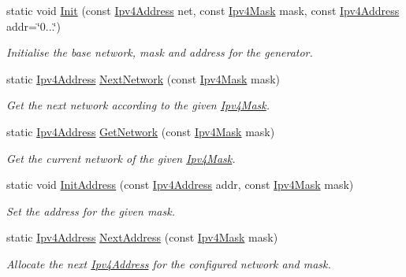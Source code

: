 \begin{DoxyCompactItemize}
\item 
static void \hyperlink{classns3_1_1Ipv4AddressGenerator_ae80dd8273837acb382ae5344e0e5c13d}{Init} (const \hyperlink{classns3_1_1Ipv4Address}{Ipv4\+Address} net, const \hyperlink{classns3_1_1Ipv4Mask}{Ipv4\+Mask} mask, const \hyperlink{classns3_1_1Ipv4Address}{Ipv4\+Address} addr=\char`\"{}0...\char`\"{})
\begin{DoxyCompactList}\small\item\em Initialise the base network, mask and address for the generator. \end{DoxyCompactList}\item 
static \hyperlink{classns3_1_1Ipv4Address}{Ipv4\+Address} \hyperlink{classns3_1_1Ipv4AddressGenerator_a5a7ad78a303bf4b381735c16186ae73b}{Next\+Network} (const \hyperlink{classns3_1_1Ipv4Mask}{Ipv4\+Mask} mask)
\begin{DoxyCompactList}\small\item\em Get the next network according to the given \hyperlink{classns3_1_1Ipv4Mask}{Ipv4\+Mask}. \end{DoxyCompactList}\item 
static \hyperlink{classns3_1_1Ipv4Address}{Ipv4\+Address} \hyperlink{classns3_1_1Ipv4AddressGenerator_ae5c58b6a9070a877a5c79a35b911f55e}{Get\+Network} (const \hyperlink{classns3_1_1Ipv4Mask}{Ipv4\+Mask} mask)
\begin{DoxyCompactList}\small\item\em Get the current network of the given \hyperlink{classns3_1_1Ipv4Mask}{Ipv4\+Mask}. \end{DoxyCompactList}\item 
static void \hyperlink{classns3_1_1Ipv4AddressGenerator_a2f9d70f0a1cee0c57d437785f17ae555}{Init\+Address} (const \hyperlink{classns3_1_1Ipv4Address}{Ipv4\+Address} addr, const \hyperlink{classns3_1_1Ipv4Mask}{Ipv4\+Mask} mask)
\begin{DoxyCompactList}\small\item\em Set the address for the given mask. \end{DoxyCompactList}\item 
static \hyperlink{classns3_1_1Ipv4Address}{Ipv4\+Address} \hyperlink{classns3_1_1Ipv4AddressGenerator_a01aa8d8b1295187c0a1c9074d63abe11}{Next\+Address} (const \hyperlink{classns3_1_1Ipv4Mask}{Ipv4\+Mask} mask)
\begin{DoxyCompactList}\small\item\em Allocate the next \hyperlink{classns3_1_1Ipv4Address}{Ipv4\+Address} for the configured network and mask. \end{DoxyCompactList}\item 

\end{DoxyCompactItemize}

